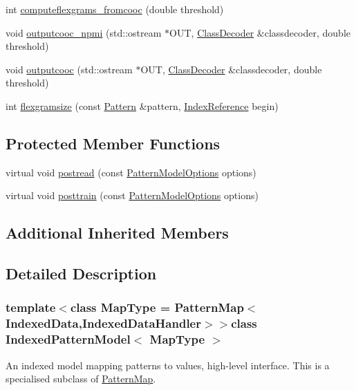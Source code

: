 \begin{DoxyCompactItemize}
\item 
int \hyperlink{classIndexedPatternModel_a2d1a24a490466115aad4cf09058337ec}{computeflexgrams\+\_\+fromcooc} (double threshold)
\item 
void \hyperlink{classIndexedPatternModel_a4e8d1bf4017173e8214cfd37bab576c1}{outputcooc\+\_\+npmi} (std\+::ostream $\ast$O\+U\+T, \hyperlink{classClassDecoder}{Class\+Decoder} \&classdecoder, double threshold)
\item 
void \hyperlink{classIndexedPatternModel_a6ab1e2d6bf0a8aeed25a39c306e51c34}{outputcooc} (std\+::ostream $\ast$O\+U\+T, \hyperlink{classClassDecoder}{Class\+Decoder} \&classdecoder, double threshold)
\item 
int \hyperlink{classIndexedPatternModel_abd312da331baffd69a7944084cc0e4f6}{flexgramsize} (const \hyperlink{classPattern}{Pattern} \&pattern, \hyperlink{classIndexReference}{Index\+Reference} begin)
\end{DoxyCompactItemize}
\subsection*{Protected Member Functions}
\begin{DoxyCompactItemize}
\item 
virtual void \hyperlink{classIndexedPatternModel_a82f5f4fffea239a4f5bde4d346691f5d}{postread} (const \hyperlink{classPatternModelOptions}{Pattern\+Model\+Options} options)
\item 
virtual void \hyperlink{classIndexedPatternModel_a4a39df881afb2ef2c6c4a29afe9aa6ff}{posttrain} (const \hyperlink{classPatternModelOptions}{Pattern\+Model\+Options} options)
\end{DoxyCompactItemize}
\subsection*{Additional Inherited Members}


\subsection{Detailed Description}
\subsubsection*{template$<$class Map\+Type = Pattern\+Map$<$\+Indexed\+Data,\+Indexed\+Data\+Handler$>$$>$class Indexed\+Pattern\+Model$<$ Map\+Type $>$}

An indexed model mapping patterns to values, high-\/level interface. This is a specialised subclass of \hyperlink{classPatternMap}{Pattern\+Map}. 


